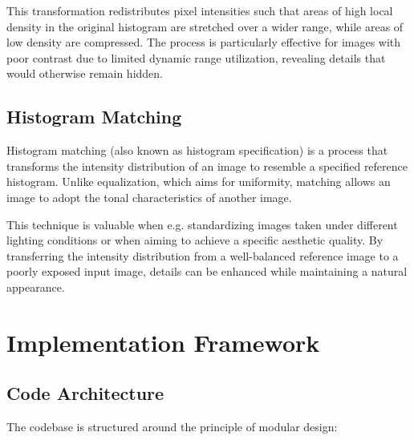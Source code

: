 \documentclass[12pt,a4paper]{article}
\begin{document}
This transformation redistributes pixel intensities such that areas of high local density in the original histogram are stretched over a wider range, while areas of low density are compressed. The process is particularly effective for images with poor contrast due to limited dynamic range utilization, revealing details that would otherwise remain hidden.

\subsection{Histogram Matching}
\label{subsec:histogram_matching}

Histogram matching (also known as histogram specification) is a process that transforms the intensity distribution of an image to resemble a specified reference histogram. Unlike equalization, which aims for uniformity, matching allows an image to adopt the tonal characteristics of another image.

This technique is valuable when e.g. standardizing images taken under different lighting conditions or when aiming to achieve a specific aesthetic quality. By transferring the intensity distribution from a well-balanced reference image to a poorly exposed input image, details can be enhanced while maintaining a natural appearance.




\section{Implementation Framework}

\subsection{Code Architecture}

The codebase is structured around the principle of modular design:
\end{document}
